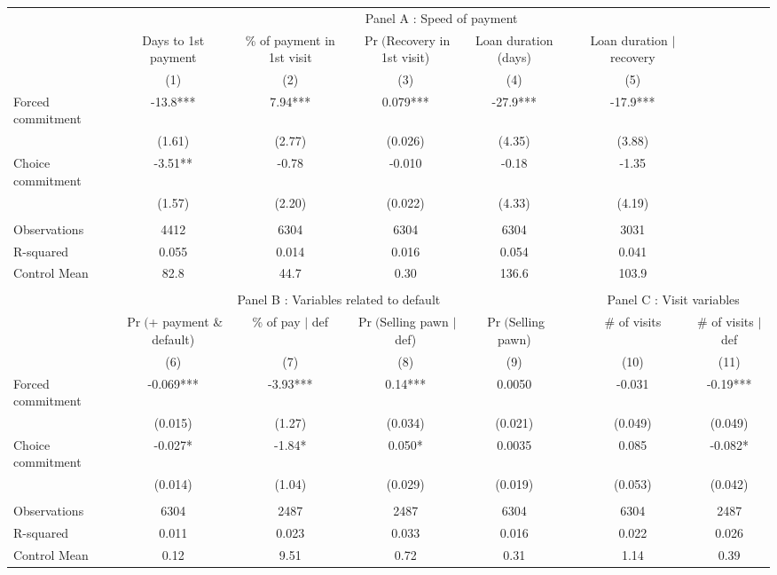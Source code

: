 \begin{tabular}{lccccccc}
\toprule
      & \multicolumn{7}{c}{Panel A  : Speed of payment} \\
\cmidrule{2-8}      & Days to 1st payment & \% of payment in 1st visit & $\Pr($Recovery in 1st visit) & Loan duration (days) &       & Loan duration $|$ recovery &  \\
\cmidrule{1-5}\cmidrule{7-8}      & (1)   & (2)   & (3)   & (4)   &       & (5)   &  \\
\cmidrule{1-5}\cmidrule{7-8}Forced commitment & -13.8*** & 7.94*** & 0.079*** & -27.9*** &       & -17.9*** &  \\
      & (1.61) & (2.77) & (0.026) & (4.35) &       & (3.88) &  \\
Choice commitment & -3.51** & -0.78 & -0.010 & -0.18 &       & -1.35 &  \\
      & (1.57) & (2.20) & (0.022) & (4.33) &       & (4.19) &  \\
      &       &       &       &       &       &       &  \\
\cmidrule{1-5}\cmidrule{7-8}Observations & 4412  & 6304  & 6304  & 6304  &       & 3031  &  \\
R-squared & 0.055 & 0.014 & 0.016 & 0.054 &       & 0.041 &  \\
Control Mean & 82.8  & 44.7  & 0.30  & 136.6 &       & 103.9 &  \\
      &       &       &       &       &       &       &  \\
\midrule
      & \multicolumn{4}{c}{Panel B  : Variables related to default} &       & \multicolumn{2}{c}{Panel C  : Visit variables} \\
\cmidrule{2-8}      & $\Pr($+ payment \& default) & \% of pay $|$ def  & $\Pr($Selling pawn $|$ def) & $\Pr($Selling pawn) &       & \# of visits & \# of visits $|$ def \\
\midrule
\midrule
      & (6)   & (7)   & (8)   & (9)   &       & (10)  & (11) \\
\midrule
\midrule
Forced commitment & -0.069*** & -3.93*** & 0.14*** & 0.0050 &       & -0.031 & -0.19*** \\
      & (0.015) & (1.27) & (0.034) & (0.021) &       & (0.049) & (0.049) \\
Choice commitment & -0.027* & -1.84* & 0.050* & 0.0035 &       & 0.085 & -0.082* \\
      & (0.014) & (1.04) & (0.029) & (0.019) &       & (0.053) & (0.042) \\
      &       &       &       &       &       &       &  \\
\cmidrule{1-5}\cmidrule{7-8}Observations & 6304  & 2487  & 2487  & 6304  &       & 6304  & 2487 \\
R-squared & 0.011 & 0.023 & 0.033 & 0.016 &       & 0.022 & 0.026 \\
Control Mean & 0.12  & 9.51  & 0.72  & 0.31  &       & 1.14  & 0.39 \\
\bottomrule
\bottomrule
\end{tabular}%

